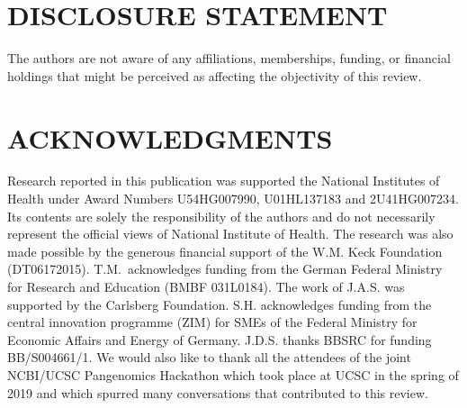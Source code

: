 
\section*{DISCLOSURE STATEMENT}
The authors are not aware of any affiliations, memberships, funding, or financial holdings that
might be perceived as affecting the objectivity of this review. 

\section*{ACKNOWLEDGMENTS}
Research reported in this publication was supported the National Institutes of Health under Award Numbers U54HG007990, U01HL137183 and 2U41HG007234.
Its contents are solely the responsibility of the authors and do not necessarily represent the official views of National Institute of Health.
The research was also made possible by the generous financial support of the W.M. Keck Foundation (DT06172015).
T.M.\ acknowledges funding from the German Federal Ministry for Research and Education (BMBF 031L0184).
The work of J.A.S. was supported by the Carlsberg Foundation.
S.H. acknowledges funding from the central innovation programme (ZIM) for SMEs of the Federal Ministry for Economic Affairs and Energy of Germany.
J.D.S. thanks BBSRC for funding BB/S004661/1.
We would also like to thank all the attendees of the joint NCBI/UCSC Pangenomics Hackathon which took place at UCSC in the spring of 2019 and which spurred many conversations that contributed to this review.
